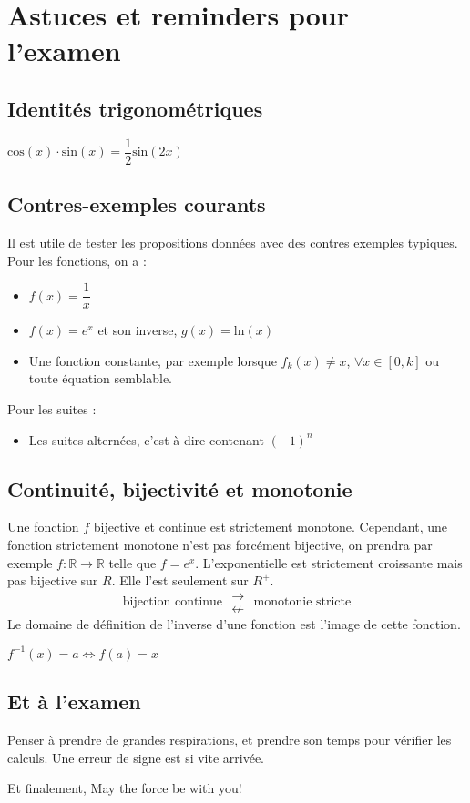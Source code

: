 \documentclass[10pt,a4paper]{book}
\newcommand{\R}{\mathbb{R}}
\begin{document}
\chapter{Astuces et reminders pour l'examen}
\section{Identités trigonométriques}
$\text{cos}(x)\cdot\text{sin}(x) = \dfrac{1}{2}\text{sin}(2x)$

\section{Contres-exemples courants}
Il est utile de tester les propositions données avec des contres exemples typiques. Pour les fonctions, on a :
\begin{itemize}
\item $f(x) = \dfrac{1}{x}$
\item $f(x) = e^x$ et son inverse, $g(x) = \text{ln}(x)$
\item Une fonction constante, par exemple lorsque $f_k(x)\neq x$, $\forall x\in [0,k]$ ou toute équation semblable.
\end{itemize}
Pour les suites :
\begin{itemize}
\item Les suites alternées, c'est-à-dire contenant $(-1)^n$
\end{itemize}

\section{Continuité, bijectivité et monotonie}
Une fonction $f$ bijective et continue est strictement monotone. Cependant, une fonction strictement monotone n'est pas forcément bijective, on prendra par exemple
$f:\R\to\R$ telle que $f=e^x$. L'exponentielle est strictement croissante mais pas bijective sur $R$. Elle l'est seulement sur $R^+$.
\[\text{bijection continue }\begin{smallmatrix}
\rightarrow \\
\nleftarrow
\end{smallmatrix}\text{ monotonie stricte}\]
Le domaine de définition de l'inverse d'une fonction est l'image de cette fonction.\par
$f^{-1}(x) = a \Leftrightarrow f(a) = x$

\section{Et à l'examen}
Penser à prendre de grandes respirations, et prendre son temps pour vérifier les calculs. Une erreur de signe est si vite arrivée. \par 
Et finalement, {May the force be with you}!
\end{document}
